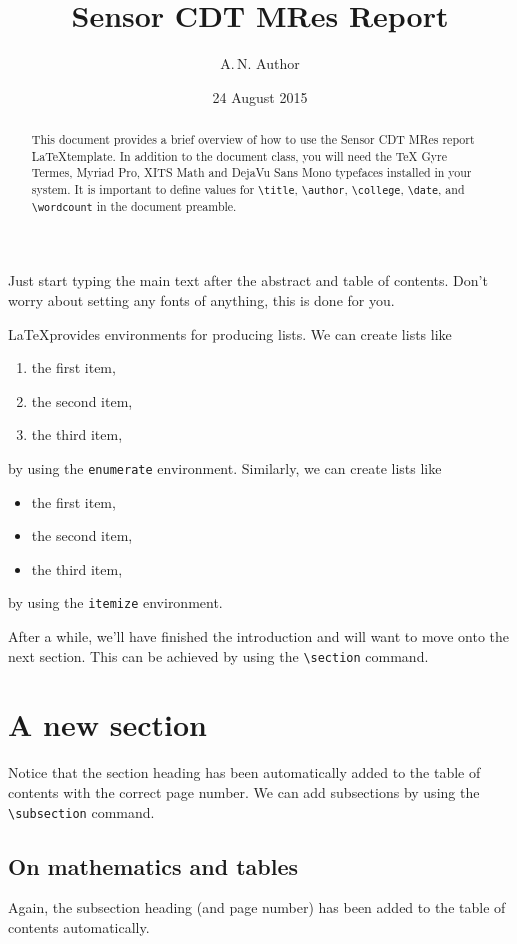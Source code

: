 \documentclass{sensor-cdt-mres}
\title{Sensor CDT MRes Report}
\author{A.\,N. Author}
\date{24 August 2015}
\begin{document}
\maketitle


\begin{abstract}
This document provides a brief overview of how to use the Sensor CDT MRes report \LaTeX template.
In addition to the document class, you will need the TeX Gyre Termes, Myriad Pro, XITS Math and DejaVu Sans Mono typefaces installed in your system.
It is important to define values for \texttt{\textbackslash title}, \texttt{\textbackslash author}, \texttt{\textbackslash college}, \texttt{\textbackslash date}, and \texttt{\textbackslash wordcount} in the document preamble.
\end{abstract}

\tableofcontents

\noindent Just start typing the main text after the abstract and table of contents.
Don't worry about setting any fonts of anything, this is done for you.

\LaTeX provides environments for producing lists.
We can create lists like
\begin{enumerate}
	\item the first item,
	\item the second item,
	\item the third item,
\end{enumerate}
by using the \texttt{enumerate} environment.
Similarly, we can create lists like
\begin{itemize}
	\item the first item,
	\item the second item,
	\item the third item,
\end{itemize}
by using the \texttt{itemize} environment.

After a while, we'll have finished the introduction and will want to move onto the next section.
This can be achieved by using the \texttt{\textbackslash section} command.

\section{A new section}
Notice that the section heading has been automatically added to the table of contents with the correct page number.
We can add subsections by using the \texttt{\textbackslash subsection} command.

\subsection{On mathematics and tables}
Again, the subsection heading (and page number) has been added to the table of contents automatically.
\end{document}
